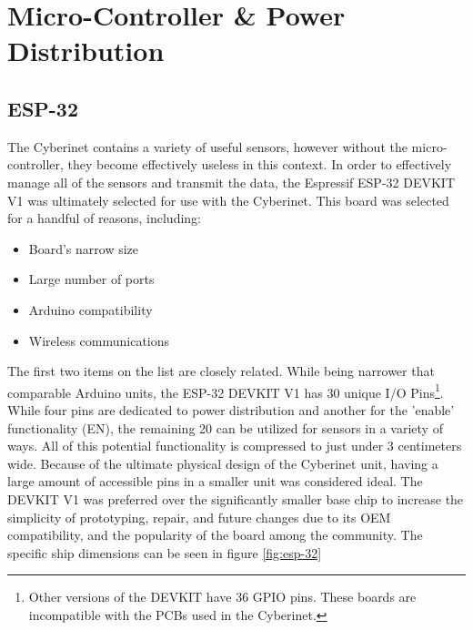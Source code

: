 \section{Micro-Controller \& Power Distribution}

\subsection{ESP-32}
The Cyberinet contains a variety of useful sensors, however without the micro-controller, they become effectively useless in this context. In order to effectively manage all of the sensors and transmit the data, the Espressif ESP-32 DEVKIT V1 was ultimately selected for use with the Cyberinet. This board was selected for a handful of reasons, including:

\begin{itemize}
    \item Board's narrow size
    \item Large number of ports
    \item Arduino compatibility
    \item Wireless communications
\end{itemize}

The first two items on the list are closely related. While being narrower that comparable Arduino units, the ESP-32 DEVKIT V1 has 30 unique I/O Pins\footnote{Other versions of the DEVKIT have 36 GPIO pins. These boards are incompatible with the PCBs used in the Cyberinet.}. While four pins are dedicated to power distribution and another for the 'enable' functionality (EN), the remaining 20 can be utilized for sensors in a variety of ways. All of this potential functionality is compressed to just under 3 centimeters wide. Because of the ultimate physical design of the Cyberinet unit, having a large amount of accessible pins in a smaller unit was considered ideal. The DEVKIT V1 was preferred over the significantly smaller base chip to increase the simplicity of prototyping, repair, and future changes due to its OEM compatibility, and the popularity of the board among the community. The specific ship dimensions can be seen in figure \ref{fig:esp-32}

